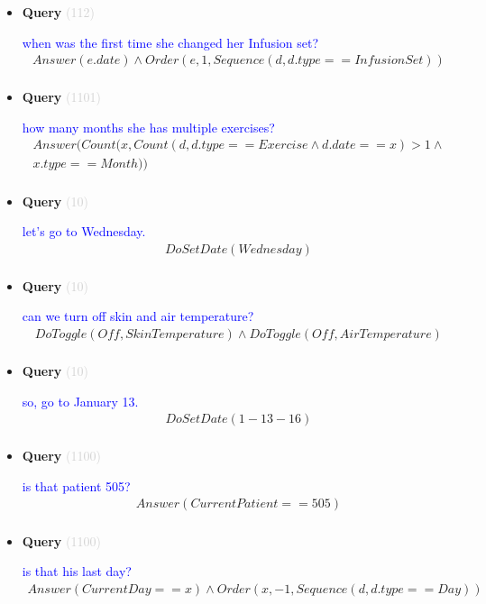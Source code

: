 \documentclass[11pt]{article}
\newcommand{\key}[1]{\textcolor{lightgray}{#1}}
\newcounter{CQuery}
\begin{document}
\begin{itemize}
\item
\textbf{Query\theCQuery} \key{(112)} \addtocounter{CQuery}{1}
\textcolor{blue}{ when was the first time she changed her Infusion set? }
\begin{multline*}
Answer(e.date) \wedge Order(e, 1, Sequence(d, d.type==InfusionSet)) \\ 
\end{multline*}


\item
\textbf{Query\theCQuery} \key{(1101)} \addtocounter{CQuery}{1}
\textcolor{blue}{ how many months she has multiple exercises? }
\begin{multline*}
Answer(Count(x, Count(d, d.type==Exercise \wedge d.date==x)>1 \wedge \\ 
x.type==Month)) \\ 
\end{multline*}


\item
\textbf{Query\theCQuery} \key{(10)} \addtocounter{CQuery}{1}
\textcolor{blue}{ let's go to Wednesday. }
\begin{multline*}
DoSetDate(Wednesday) \\ 
\end{multline*}


\item
\textbf{Query\theCQuery} \key{(10)} \addtocounter{CQuery}{1}
\textcolor{blue}{ can we turn off skin and air temperature? }
\begin{multline*}
DoToggle(Off, SkinTemperature) \wedge DoToggle(Off, AirTemperature) \\ 
\end{multline*}


\item
\textbf{Query\theCQuery} \key{(10)} \addtocounter{CQuery}{1}
\textcolor{blue}{ so, go to January 13. }
\begin{multline*}
DoSetDate(1-13-16) \\ 
\end{multline*}


\item
\textbf{Query\theCQuery} \key{(1100)} \addtocounter{CQuery}{1}
\textcolor{blue}{ is that patient 505? }
\begin{multline*}
Answer(CurrentPatient==505) \\ 
\end{multline*}


\item
\textbf{Query\theCQuery} \key{(1100)} \addtocounter{CQuery}{1}
\textcolor{blue}{ is that his last day? }
\begin{multline*}
Answer(CurrentDay==x) \wedge Order(x, -1, Sequence(d, d.type==Day)) \\ 
\end{multline*}



\end{itemize}
\end{document}
